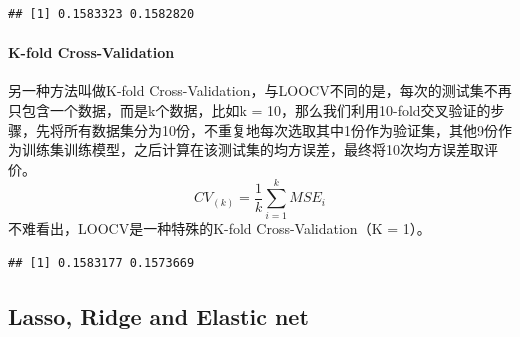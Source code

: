 \documentclass[]{article}
\newenvironment{Shaded}{\begin{snugshade}}{\end{snugshade}}
\newcommand{\KeywordTok}[1]{\textcolor[rgb]{0.13,0.29,0.53}{\textbf{#1}}}
\newcommand{\DataTypeTok}[1]{\textcolor[rgb]{0.13,0.29,0.53}{#1}}
\newcommand{\DecValTok}[1]{\textcolor[rgb]{0.00,0.00,0.81}{#1}}
\newcommand{\StringTok}[1]{\textcolor[rgb]{0.31,0.60,0.02}{#1}}
\newcommand{\OperatorTok}[1]{\textcolor[rgb]{0.81,0.36,0.00}{\textbf{#1}}}
\newcommand{\NormalTok}[1]{#1}
\let\oldparagraph\paragraph
\renewcommand{\paragraph}[1]{\oldparagraph{#1}\mbox{}}
\begin{document}
\begin{verbatim}
## [1] 0.1583323 0.1582820
\end{verbatim}

\paragraph{K-fold Cross-Validation}\label{k-fold-cross-validation}

另一种方法叫做K-fold
Cross-Validation，与LOOCV不同的是，每次的测试集不再只包含一个数据，而是k个数据，比如k
=
10，那么我们利用10-fold交叉验证的步骤，先将所有数据集分为10份，不重复地每次选取其中1份作为验证集，其他9份作为训练集训练模型，之后计算在该测试集的均方误差，最终将10次均方误差取评价。
\[
CV_{(k)} = \frac{1}{k}\sum_{i = 1}^{k}MSE_i
\] 不难看出，LOOCV是一种特殊的K-fold Cross-Validation（K = 1）。

\begin{Shaded}
\end{Shaded}

\begin{verbatim}
## [1] 0.1583177 0.1573669
\end{verbatim}







%
\subsection{Lasso, Ridge and Elastic
net}\label{lasso-ridge-and-elastic-net}
\end{document}
